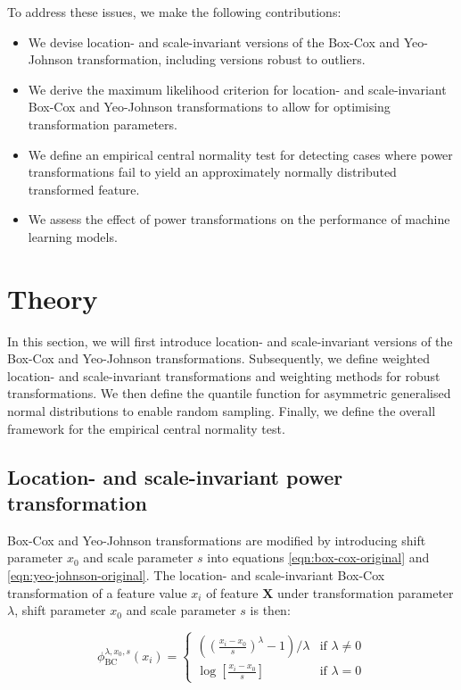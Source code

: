\documentclass[
  a4paper,
]{article}
\begin{document}
To address these issues, we make the following contributions:

\begin{itemize}
\item
  We devise location- and scale-invariant versions of the Box-Cox and
  Yeo-Johnson transformation, including versions robust to outliers.
\item
  We derive the maximum likelihood criterion for location- and
  scale-invariant Box-Cox and Yeo-Johnson transformations to allow for
  optimising transformation parameters.
\item
  We define an empirical central normality test for detecting cases
  where power transformations fail to yield an approximately normally
  distributed transformed feature.
\item
  We assess the effect of power transformations on the performance of
  machine learning models.
\end{itemize}

\section{Theory}\label{theory}

In this section, we will first introduce location- and scale-invariant
versions of the Box-Cox and Yeo-Johnson transformations. Subsequently,
we define weighted location- and scale-invariant transformations and
weighting methods for robust transformations. We then define the
quantile function for asymmetric generalised normal distributions to
enable random sampling. Finally, we define the overall framework for the
empirical central normality test.

\subsection{Location- and scale-invariant power
transformation}\label{location--and-scale-invariant-power-transformation}

Box-Cox and Yeo-Johnson transformations are modified by introducing
shift parameter \(x_0\) and scale parameter \(s\) into equations
\ref{eqn:box-cox-original} and \ref{eqn:yeo-johnson-original}. The
location- and scale-invariant Box-Cox transformation of a feature value
\(x_i\) of feature \(\mathbf{X}\) under transformation parameter
\(\lambda\), shift parameter \(x_0\) and scale parameter \(s\) is then:

\begin{equation}
\label{eqn:box-cox-invariant}
\phi_{\text{BC}}^{\lambda, x_0, s} (x_i) = 
\begin{cases}
\left( \left(\frac{x_i - x_0}{s} \right)^\lambda - 1 \right) / \lambda & \text{if } \lambda \neq 0\\
\log\left[\frac{x_i - x_0}{s}\right] & \text{if } \lambda = 0
\end{cases}
\end{equation}
\end{document}
